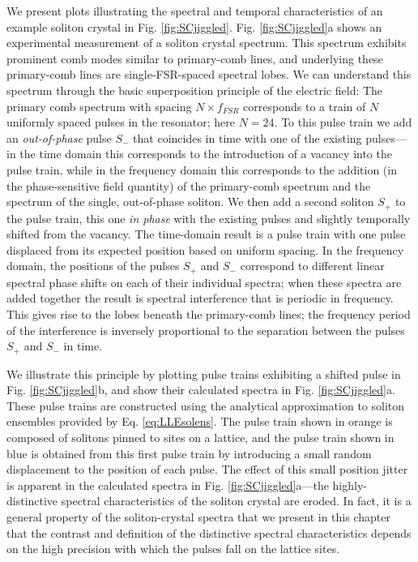 We present plots illustrating the spectral and temporal characteristics of an example soliton crystal in Fig. \ref{fig:SCjiggled}. Fig. \ref{fig:SCjiggled}a shows an experimental measurement of a soliton crystal spectrum. This spectrum exhibits prominent comb modes similar to primary-comb lines, and underlying these primary-comb lines are single-FSR-spaced spectral lobes. We can understand this spectrum through the basic superposition principle of the electric field: The primary comb spectrum with spacing $N\times f_{FSR}$ corresponds to a train of $N$ uniformly spaced pulses in the resonator; here $N=24$. To this pulse train we add an \textit{out-of-phase} pulse $S_-$ that coincides in time with one of the existing pulses---in the time domain this corresponds to the introduction of a vacancy into the pulse train, while in the frequency domain this corresponds to the addition (in the phase-sensitive field quantity) of the primary-comb spectrum and the spectrum of the single, out-of-phase soliton. We then add a second soliton $S_+$  to the pulse train, this one \textit{in phase} with the existing pulses and slightly temporally shifted from the vacancy. The time-domain result is a pulse train with one pulse displaced from its expected position based on uniform spacing. In the frequency domain, the positions of the pulses $S_+$ and $S_-$ correspond to different linear spectral phase shifts on each of their individual spectra; when these spectra are added together the result is spectral interference that is periodic in frequency. This gives rise to the lobes beneath the primary-comb lines; the frequency period of the interference is inversely proportional to the separation between the pulses $S_+$ and $S_-$ in time.

We illustrate this principle by plotting pulse trains exhibiting a shifted pulse in Fig. \ref{fig:SCjiggled}b, and show their calculated spectra in Fig. \ref{fig:SCjiggled}a. These pulse trains are constructed using the analytical approximation to soliton ensembles provided by Eq. \ref{eq:LLEsolens}. The pulse train shown in orange is composed of solitons pinned to sites on a lattice, and the pulse train shown in blue is obtained from this first pulse train by introducing a small random displacement to the position of each pulse. The effect of this small position jitter is apparent in the calculated spectra in Fig. \ref{fig:SCjiggled}a---the highly-distinctive spectral characteristics of the soliton crystal are eroded. In fact, it is a general property of the soliton-crystal spectra that we present in this chapter that the contrast and definition of the distinctive spectral characteristics depends on the high precision with which the pulses fall on the lattice sites.

